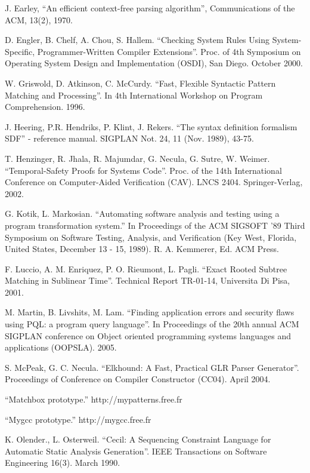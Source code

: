 \documentclass{sigplanconf}
\begin{document}
\begin{thebibliography}{10}
 J. Earley, ``An efficient context-free parsing
algorithm'', Communications of the ACM, 13(2), 1970.

 D. Engler, B. Chelf, A. Chou, S. Hallem. ``Checking
System Rules Using System-Specific, Programmer-Written Compiler
Extensions''. Proc. of 4th Symposium on Operating System Design and
Implementation (OSDI), San Diego. October 2000.

 W. Griswold, D. Atkinson, C. McCurdy. ``Fast, Flexible
Syntactic Pattern Matching and Processing''. In 4th International
Workshop on Program Comprehension. 1996.

 J. Heering, P.R. Hendriks, P. Klint, J. Rekers. ``The
syntax definition formalism SDF'' - reference manual. SIGPLAN Not. 24,
11 (Nov. 1989), 43-75.

 T. Henzinger, R. Jhala, R. Majumdar, G. Necula,
G. Sutre, W. Weimer. ``Temporal-Safety Proofs for Systems
Code''. Proc. of the 14th International Conference on Computer-Aided
Verification (CAV). LNCS 2404. Springer-Verlag, 2002.

 G. Kotik, L. Markosian. ``Automating software
analysis and testing using a program transformation system.'' In
Proceedings of the ACM SIGSOFT '89 Third Symposium on Software
Testing, Analysis, and Verification (Key West, Florida, United States,
December 13 - 15, 1989). R. A. Kemmerer, Ed. ACM Press.

 F. Luccio, A. M. Enriquez, P. O. Rieumont,
L. Pagli. ``Exact Rooted Subtree Matching in Sublinear
Time''. Technical Report TR-01-14, Universita Di Pisa, 2001.

 M. Martin, B. Livshits, M. Lam. ``Finding application
errors and security flaws using PQL: a program query language''. In
Proceedings of the 20th annual ACM SIGPLAN conference on Object
oriented programming systems languages and applications
(OOPSLA). 2005.

 S. McPeak, G. C. Necula. ``Elkhound: A Fast,
Practical GLR Parser Generator''. Proceedings of Conference on Compiler
Constructor (CC04). April 2004.

 ``Matchbox prototype.'' http://mypatterns.free.fr

 ``Mygcc prototype.'' http://mygcc.free.fr

 K. Olender., L. Osterweil. ``Cecil: A Sequencing
Constraint Language for Automatic Static Analysis Generation''. IEEE
Transactions on Software Engineering 16(3). March 1990.


\end{thebibliography}
\end{document}
